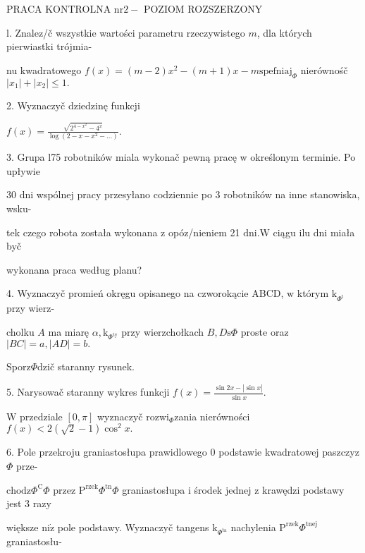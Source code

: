 \documentclass[a4paper,12pt]{article}
\begin{document}
PRACA KONTROLNA $\mathrm{n}\mathrm{r} 2-$ POZIOM ROZSZERZONY

l. Znalez/č wszystkie wartości parametru rzeczywistego $m$, dla których pierwiastki trójmia-

nu kwadratowego $f(x)=(m-2)x^{2}-(m+1)x-m \mathrm{s}\mathrm{p}\mathrm{e}\mathrm{f}\mathrm{n}\mathrm{i}\mathrm{a}\mathrm{j}_{\Phi}$ nierównośč $|x_{1}|+|x_{2}|\leq 1.$

2. Wyznaczyč dziedzinę funkcji

$f(x)=\displaystyle \frac{\sqrt{2^{4-x^{2}}-4^{x}}}{\log(2-x-x^{2}-\ldots)}.$

3. Grupa l75 robotników miala wykonač pewną pracę $\mathrm{w}$ określonym terminie. Po upływie

30 dni wspólnej pracy przesyłano codziennie po 3 robotników na inne stanowiska, wsku-

tek czego robota została wykonana $\mathrm{z}$ opóz/nieniem 21 $\mathrm{d}\mathrm{n}\mathrm{i}. \mathrm{W}$ ciągu ilu dni miała byč

wykonana praca według planu?

4. Wyznaczyč promień okręgu opisanego na czworokącie ABCD, $\mathrm{w}$ którym $\mathrm{k}_{\Phi^{\mathrm{t}}}$ przy wierz-

cholku $A$ ma miarę $\alpha, \mathrm{k}_{\Phi^{\mathrm{t}\mathrm{y}}}$ przy wierzchołkach $B,  D\mathrm{s}\Phi$ proste oraz $|BC|=a, |AD|=b.$

Sporz$\Phi$dzič staranny rysunek.

5. Narysowač staranny wykres funkcji $f(x)=\displaystyle \frac{\sin 2x-|\sin x|}{\sin x}.$

$\mathrm{W}$ przedziale $[0,\pi]$ wyznaczyč $\mathrm{r}\mathrm{o}\mathrm{z}\mathrm{w}\mathrm{i}_{\Phi}$zania nierówności $f(x)<2(\sqrt{2}-1)\cos^{2}x.$

6. Pole przekroju graniastosłupa prawidlowego $0$ podstawie kwadratowej paszczyz$\Phi$ prze-

$\mathrm{c}\mathrm{h}\mathrm{o}\mathrm{d}\mathrm{z}\Phi^{\mathrm{C}}\Phi$ przez $\mathrm{P}^{\mathrm{r}\mathrm{z}\mathrm{e}\mathrm{k}}\Phi^{\mathrm{t}\mathrm{n}}\Phi$ graniastosłupa $\mathrm{i}$ środek jednej $\mathrm{z}$ krawędzi podstawy jest 3 razy

większe $\mathrm{n}\mathrm{i}\dot{\mathrm{z}}$ pole podstawy. Wyznaczyč tangens $\mathrm{k}_{\Phi^{\mathrm{t}\mathrm{a}}}$ nachylenia $\mathrm{P}^{\mathrm{r}\mathrm{z}\mathrm{e}\mathrm{k}}\Phi^{\mathrm{t}\mathrm{n}\mathrm{e}\mathrm{j}}$ graniastosłu-
\end{document}
